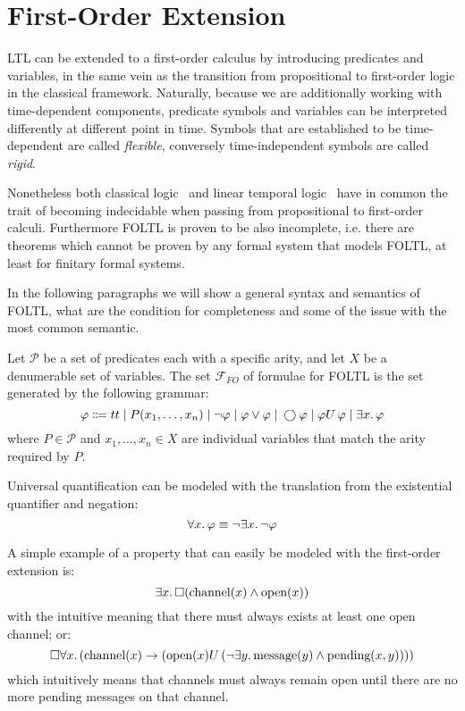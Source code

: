\section{First-Order Extension}

LTL can be extended to a first-order calculus by introducing predicates and variables, in the same vein as the
transition from propositional to first-order logic in the classical framework. Naturally, because we are additionally
working with time-dependent components, predicate symbols and variables can be interpreted differently at different
point in time. Symbols that are established to be time-dependent are called \emph{flexible}, conversely time-independent
symbols are called \emph{rigid}.

Nonetheless both classical logic~\cite{turing_computable_1937} and linear temporal logic~\cite{merz_decidability_1992}
have in common the trait of becoming indecidable when passing from propositional to first-order calculi.
Furthermore \ac{FOLTL} is proven to be also incomplete, i.e. there are theorems which cannot be proven by any formal
system that models \ac{FOLTL}, at least for finitary formal systems.

In the following paragraphs we will show a general syntax and semantics of \ac{FOLTL}, what are
the condition for completeness and some of the issue with the most common semantic.

\begin{definition}\label{def:kripkefoltlsyn}
  Let $\mathcal{P}$ be a set of predicates each with a specific arity, and let $X$ be a denumerable set of variables.
  The set $\mathcal{F}_{FO}$ of formulae for \ac{FOLTL} is the set generated by the following grammar:
  \[
    \varphi \Coloneqq tt \;|\; P(x_1, \ldots, x_n)
                      \;|\; \neg\varphi
                      \;|\; \varphi \lor \varphi
                      \;|\; \bigcirc{\varphi}
                      \;|\; {\varphi}U\,{\varphi}
                      \;|\; \exists {x} \ldotp {\varphi}
  \]
  where $P \in \mathcal{P}$ and $x_1, \ldots, x_n \in X$ are individual variables that match the arity required by $P$.
\end{definition}
Universal quantification can be modeled with the translation from the existential quantifier and negation:
\[
  \forall {x} \ldotp {\varphi} \equiv \neg\exists {x} \ldotp {\neg\varphi}
\]

A simple example of a property that can easily be modeled with the first-order extension is:
\[
  \exists {x} \ldotp {\Box{(\text{channel}(x) \land \text{open}(x))}}
\]
with the intuitive meaning that there must always exists at least one open channel; or:
\[
  \Box{\forall {x} \ldotp {(\text{channel}(x)} \to ({\text{open}(x)}U\,{(\neg\exists {y} \ldotp {\text{message}(y) \land \text{pending}(x, y)})}))}
\]
which intuitively means that channels must always remain open until there are no more pending messages on that channel.

